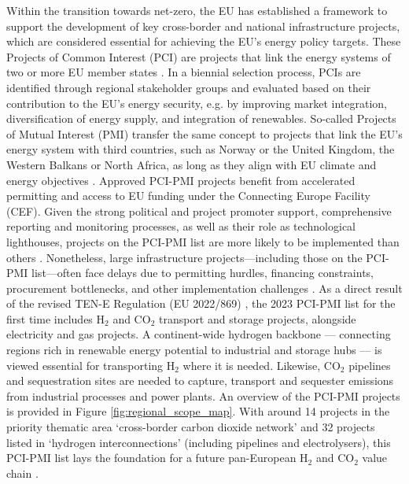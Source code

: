\documentclass[pdflatex,sn-nature]{sn-jnl}
\theoremstyle{thmstyleone}%
\theoremstyle{thmstyletwo}%
\theoremstyle{thmstylethree}%
\begin{document}
Within the transition towards net-zero, the EU has established a framework to support the development of key cross-border and national infrastructure projects, which are considered essential for achieving the EU's energy policy targets. These Projects of Common Interest (PCI) are projects that link the energy systems of two or more EU member states \cite{europeancommissionRegulationEUNo2022}. In a biennial selection process, PCIs are identified through regional stakeholder groups and evaluated based on their contribution to the EU's energy security, e.g. by improving market integration, diversification of energy supply, and integration of renewables. So-called Projects of Mutual Interest (PMI) transfer the same concept to projects that link the EU's energy system with third countries, such as Norway or the United Kingdom, the Western Balkans or North Africa, as long as they align with EU climate and energy objectives \cite{europeancommissionCommissionDelegatedRegulation2023}. Approved PCI-PMI projects benefit from accelerated permitting and access to EU funding under the Connecting Europe Facility (CEF). Given the strong political and project promoter support, comprehensive reporting and monitoring processes, as well as their role as technological lighthouses, projects on the PCI-PMI list are more likely to be implemented than others \cite{europeancommission.directorategeneralforenergy.InvestmentNeedsEuropean2025}. Nonetheless, large infrastructure projects—including those on the PCI-PMI list—often face delays due to permitting hurdles, financing constraints, procurement bottlenecks, and other implementation challenges \cite{acerConsolidatedReportProgress2023}. 
As a direct result of the revised TEN-E Regulation (EU 2022/869) \cite{europeanparliamentRegulationEU20222022}, the 2023 PCI-PMI list \cite{europeancommissionCommissionDelegatedRegulation2023,europeancommissionPCIPMITransparencyPlatform2024} for the first time includes H$_2$ and CO$_2$ transport and storage projects, alongside electricity and gas projects. A continent-wide hydrogen backbone --- connecting regions rich in renewable energy potential to industrial and storage hubs --- is viewed essential for transporting H$_2$ where it is needed. Likewise, CO$_2$ pipelines and sequestration sites are needed to capture, transport and sequester emissions from industrial processes and power plants. An overview of the PCI-PMI projects is provided in Figure \ref{fig:regional_scope_map}. With around 14 projects in the priority thematic area `cross-border carbon dioxide network' and 32 projects listed in `hydrogen interconnections' (including pipelines and electrolysers), this PCI-PMI list lays the foundation for a future pan-European H$_2$ and CO$_2$ value chain \cite{europeancommissionAnnexFirstUnion2023}.
\end{document}
